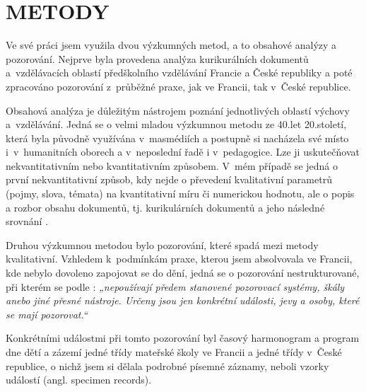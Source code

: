 
\chapter{METODY}

Ve své práci jsem využila dvou výzkumných metod, a to obsahové analýzy a pozorování. Nejprve byla provedena analýza kurikurálních dokumentů a vzdělávacích oblastí předškolního vzdělávání Francie a České republiky a poté zpracováno pozorování z průběžné praxe, jak ve Francii, tak v České republice.

Obsahová analýza je důležitým nástrojem poznání jednotlivých oblastí výchovy a vzdělávání. Jedná se o velmi mladou výzkumnou metodu ze 40.let 20.století, která byla původně využívána v masmédiích a postupně si nacházela své místo i v humanitních oborech a v neposlední řadě i v pedagogice. Lze ji uskutečňovat nekvantitativním nebo kvantitativním způsobem. V mém případě se jedná o první nekvantitativní způsob, kdy nejde o převedení kvalitativní parametrů (pojmy, slova, témata) na kvantitativní míru či numerickou hodnotu, ale o popis a rozbor obsahu dokumentů, tj. kurikulárních dokumentů a jeho následné srovnání \citep{Gavora08}.

Druhou výzkumnou metodou bylo pozorování, které spadá mezi metody kvalitativní. Vzhledem k podmínkám praxe, kterou jsem absolvovala ve Francii, kde nebylo dovoleno zapojovat se do dění, jedná se o pozorování nestrukturované, při kterém se podle \citet[s.~17]{Gavora96}: \textit{„nepoužívají předem stanovené pozorovací systémy, škály anebo jiné přesné nástroje. Určeny jsou jen konkrétní události, jevy a osoby, které se mají pozorovat.“} 

Konkrétními událostmi při tomto pozorování byl časový harmonogram a program dne dětí a zázemí jedné třídy mateřské školy ve Francii a jedné třídy v České republice, o nichž jsem si dělala podrobné písemné záznamy, neboli vzorky událostí (angl. specimen records). 
